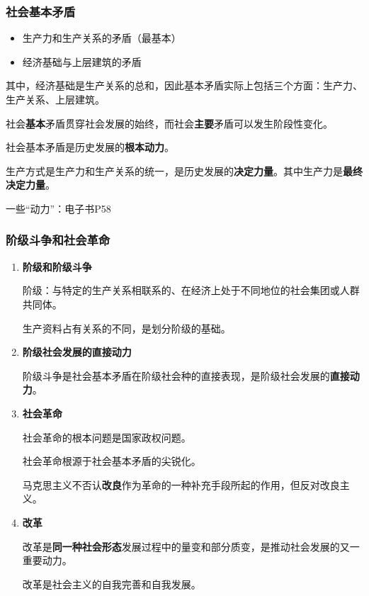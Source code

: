 \documentclass[12pt, a4paper, oneside]{ctexart}
\begin{document}
\subsubsection{社会基本矛盾}

\begin{itemize}
  \item 生产力和生产关系的矛盾（最基本）
  \item 经济基础与上层建筑的矛盾
\end{itemize}

其中，经济基础是生产关系的总和，因此基本矛盾实际上包括三个方面：生产力、生产关系、上层建筑。

社会\textbf{基本}矛盾贯穿社会发展的始终，而社会\textbf{主要}矛盾可以发生阶段性变化。

社会基本矛盾是历史发展的\textbf{根本动力}。

生产方式是生产力和生产关系的统一，是历史发展的\textbf{决定力量}。其中生产力是\textbf{最终决定力量}。

一些“动力”：电子书P58

\subsubsection{阶级斗争和社会革命}

\begin{enumerate}
  \item {\bf 阶级和阶级斗争}
  
  阶级：与特定的生产关系相联系的、在经济上处于不同地位的社会集团或人群共同体。

  生产资料占有关系的不同，是划分阶级的基础。

  \item {\bf 阶级社会发展的直接动力}
  
  阶级斗争是社会基本矛盾在阶级社会种的直接表现，是阶级社会发展的\textbf{直接动力}。

  \item {\bf 社会革命}
  
  社会革命的根本问题是国家政权问题。

  社会革命根源于社会基本矛盾的尖锐化。

  马克思主义不否认\textbf{改良}作为革命的一种补充手段所起的作用，但反对改良主义。

  \item {\bf 改革}
  
  改革是\textbf{同一种社会形态}发展过程中的量变和部分质变，是推动社会发展的又一重要动力。

  改革是社会主义的自我完善和自我发展。
\end{enumerate}
\end{document}
